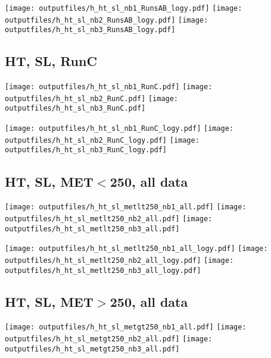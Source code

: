 \documentclass[11pt]{article}
\begin{document}
    \noindent
     \texttt{[image: outputfiles/h\_ht\_sl\_nb1\_RunsAB\_logy.pdf]}
     \texttt{[image: outputfiles/h\_ht\_sl\_nb2\_RunsAB\_logy.pdf]}
     \texttt{[image: outputfiles/h\_ht\_sl\_nb3\_RunsAB\_logy.pdf]}


    \subsection{ HT, SL, RunC}

    \noindent
     \texttt{[image: outputfiles/h\_ht\_sl\_nb1\_RunC.pdf]}
     \texttt{[image: outputfiles/h\_ht\_sl\_nb2\_RunC.pdf]}
     \texttt{[image: outputfiles/h\_ht\_sl\_nb3\_RunC.pdf]}

    \noindent
     \texttt{[image: outputfiles/h\_ht\_sl\_nb1\_RunC\_logy.pdf]}
     \texttt{[image: outputfiles/h\_ht\_sl\_nb2\_RunC\_logy.pdf]}
     \texttt{[image: outputfiles/h\_ht\_sl\_nb3\_RunC\_logy.pdf]}


    \subsection{ HT, SL, MET$<$250, all data}

    \noindent
     \texttt{[image: outputfiles/h\_ht\_sl\_metlt250\_nb1\_all.pdf]}
     \texttt{[image: outputfiles/h\_ht\_sl\_metlt250\_nb2\_all.pdf]}
     \texttt{[image: outputfiles/h\_ht\_sl\_metlt250\_nb3\_all.pdf]}

    \noindent
     \texttt{[image: outputfiles/h\_ht\_sl\_metlt250\_nb1\_all\_logy.pdf]}
     \texttt{[image: outputfiles/h\_ht\_sl\_metlt250\_nb2\_all\_logy.pdf]}
     \texttt{[image: outputfiles/h\_ht\_sl\_metlt250\_nb3\_all\_logy.pdf]}


    \subsection{ HT, SL, MET$>$250, all data}

    \noindent
     \texttt{[image: outputfiles/h\_ht\_sl\_metgt250\_nb1\_all.pdf]}
     \texttt{[image: outputfiles/h\_ht\_sl\_metgt250\_nb2\_all.pdf]}
     \texttt{[image: outputfiles/h\_ht\_sl\_metgt250\_nb3\_all.pdf]}
\end{document}
